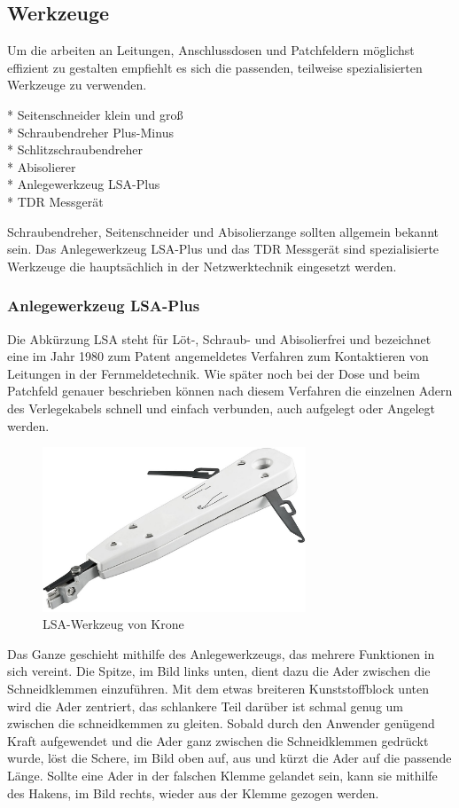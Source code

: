 \documentclass[
a4paper,     %
 headsepline, %
11pt         %
]{scrartcl}  %
\begin{document}
\subsection{Werkzeuge}
Um die arbeiten an Leitungen, Anschlussdosen und Patchfeldern möglichst effizient zu gestalten empfiehlt es sich die passenden, teilweise spezialisierten Werkzeuge zu verwenden.
\begin{itemize}
	* Seitenschneider klein und groß \\
	* Schraubendreher Plus-Minus \\
	* Schlitzschraubendreher \\
	* Abisolierer \\
	* Anlegewerkzeug LSA-Plus \\
	* TDR Messgerät
\end{itemize}
Schraubendreher, Seitenschneider und Abisolierzange sollten allgemein bekannt sein. 
Das Anlegewerkzeug LSA-Plus und das TDR Messgerät sind spezialisierte Werkzeuge die hauptsächlich in der Netzwerktechnik eingesetzt werden.

\subsubsection{Anlegewerkzeug LSA-Plus}
Die Abkürzung LSA steht für Löt-, Schraub- und Abisolierfrei und bezeichnet eine im Jahr 1980 zum Patent angemeldetes Verfahren zum Kontaktieren von Leitungen in der Fernmeldetechnik.
Wie später noch bei der Dose und beim Patchfeld genauer beschrieben können nach diesem Verfahren die einzelnen Adern des Verlegekabels schnell und einfach verbunden, auch aufgelegt oder Angelegt werden.

\begin{figure}[htbp] 
	\centering
	\includegraphics[width=0.7\textwidth]{lsa-werkzeug.jpeg}
	\caption{LSA-Werkzeug von Krone}
	\label{fig:LSA1}
\end{figure}

Das Ganze geschieht mithilfe des Anlegewerkzeugs, das mehrere Funktionen in sich vereint.
Die Spitze, im Bild links unten, dient dazu die Ader zwischen die Schneidklemmen einzuführen.
Mit dem etwas breiteren Kunststoffblock unten wird die Ader zentriert, das schlankere Teil darüber ist schmal genug um zwischen die schneidkemmen zu gleiten.
Sobald durch den Anwender genügend Kraft aufgewendet und die Ader ganz zwischen die Schneidklemmen gedrückt wurde, löst die Schere, im Bild oben auf, aus und kürzt die Ader auf die passende Länge.
Sollte eine Ader in der falschen Klemme gelandet sein, kann sie mithilfe des Hakens, im Bild rechts, wieder aus der Klemme gezogen werden. 
\end{document}

